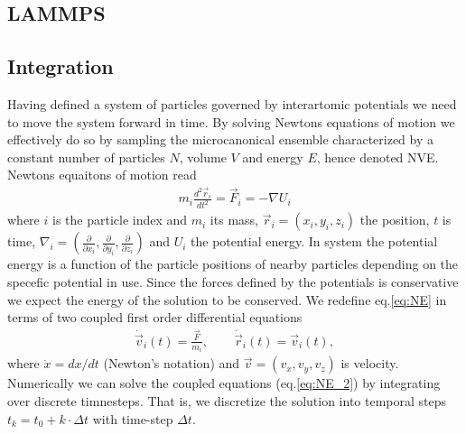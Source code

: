 \subsection{LAMMPS}
\subsection{Integration}

Having defined a system of particles governed by interartomic potentials we need
to move the system forward in time. By solving Newtons equations of motion we
effectively do so by sampling the microcanonical ensemble characterized by a
constant number of particles $N$, volume $V$ and energy $E$, hence denoted NVE.
Newtons equaitons of motion read
\begin{align}
  m_i \frac{d^2 \vec{r}_i}{dt^2} = \vec{F}_i = -\nabla U_i
  \label{eq:NE}
\end{align}
where $i$ is the particle index and $m_i$ its mass, $\vec{r}_i = (x_i, y_i,
z_i)$ the position, $t$ is time,  $\nabla_i = (\frac{\partial}{\partial x_i},
\frac{\partial}{\partial y_i}, \frac{\partial}{\partial z_i})$ and $U_i$ the
potential energy. In system the potential energy is a function of the particle
positions of nearby particles depending on the specefic potential in use. Since
the forces defined by the potentials is conservative we expect the energy of the
solution to be conserved. We redefine eq.\eqref{eq:NE} in terms of two coupled
first order differential equations 
\begin{align}
  \dot{\vec{v}}_i(t) = \frac{\vec{F}}{m_i}, \qquad \dot{\vec{r}}_i(t) = \vec{v}_i(t),
  \label{eq:NE_2}
\end{align}
where $\dot{x} = dx/dt$ (Newton's notation) and $\vec{v} = (v_x, v_y, v_z)$ is
velocity. Numerically we can solve the coupled equations (eq.\eqref{eq:NE_2}) by
integrating over discrete timnesteps. That is, we discretize the solution into
temporal steps $t_k = t_0 + k\cdot \Delta t$ with time-step $\Delta t$. 


